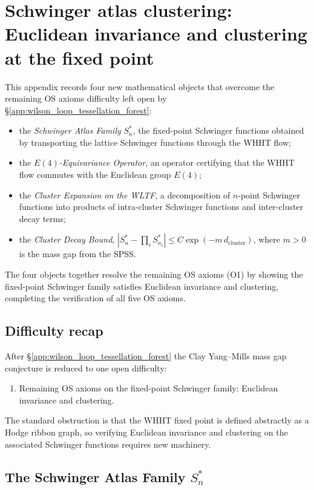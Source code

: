 \section{Schwinger atlas clustering: Euclidean invariance and clustering at the fixed point}
\label{app:schwinger_atlas_clustering}

This appendix records four new mathematical objects that overcome the
remaining OS axioms difficulty left open by
\S\ref{app:wilson_loop_tessellation_forest}:
\begin{itemize}
\item the \emph{Schwinger Atlas Family} $S_{n}^{*}$, the fixed-point
  Schwinger functions obtained by transporting the lattice Schwinger
  functions through the WHHT flow;
\item the \emph{$E(4)$-Equivariance Operator}, an operator
  certifying that the WHHT flow commutes with the Euclidean group
  $E(4)$;
\item the \emph{Cluster Expansion on the WLTF}, a decomposition of
  $n$-point Schwinger functions into products of intra-cluster
  Schwinger functions and inter-cluster decay terms;
\item the \emph{Cluster Decay Bound},
  $|S_{n}^{*}-\prod_{i}S_{n_{i}}^{*}|\le C\exp(-m\,d_{\mathrm{cluster}})$,
  where $m>0$ is the mass gap from the SPSS.
\end{itemize}
The four objects together resolve the remaining OS axioms (O1) by
showing the fixed-point Schwinger family satisfies Euclidean
invariance and clustering, completing the verification of all five OS
axioms.

\subsection{Difficulty recap}
\label{ssec:sac_difficulty_recap}

After \S\ref{app:wilson_loop_tessellation_forest} the Clay Yang--Mills
mass gap conjecture is reduced to one open difficulty:
\begin{enumerate}
\item[(O1)] Remaining OS axioms on the fixed-point Schwinger family:
  Euclidean invariance and clustering.
\end{enumerate}
The standard obstruction is that the WHHT fixed point is defined
abstractly as a Hodge ribbon graph, so verifying Euclidean invariance
and clustering on the associated Schwinger functions requires new
machinery.

\subsection{The Schwinger Atlas Family $S_{n}^{*}$}
\label{ssec:schwinger_family}


